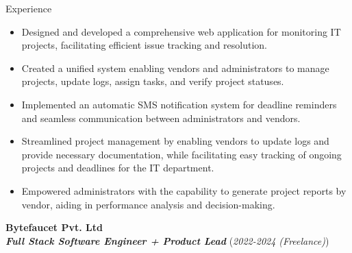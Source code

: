 \documentclass{resume} %
\begin{document}
\begin{rSection}{Experience}
    \begin{itemize}
        \item Designed and developed a comprehensive web application for monitoring IT projects, facilitating efficient issue tracking and resolution.
        \item Created a unified system enabling vendors and administrators to manage projects, update logs, assign tasks, and verify project statuses.
        \item Implemented an automatic SMS notification system for deadline reminders and seamless communication between administrators and vendors.
        \item Streamlined project management by enabling vendors to update logs and provide necessary documentation, while facilitating easy tracking of ongoing projects and deadlines for the IT department.
        \item Empowered administrators with the capability to generate project reports by vendor, aiding in performance analysis and decision-making.
    \end{itemize}

    \large{{\bf Bytefaucet Pvt. Ltd}}
    \\ \small{\textit{\textbf{Full Stack Software Engineer + Product Lead}}} (\small{\textit{2022-2024 (Freelance)}})


\end{rSection}
\end{document}
